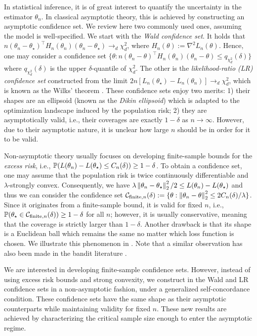 In statistical inference, it is of great interest to quantify the uncertainty in the estimator $\theta_n$.
In classical asymptotic theory, this is achieved by constructing an asymptotic confidence set.
We review here two commonly used ones, assuming the model is well-specified.
We start with the \emph{Wald confidence set}.
It holds that $n(\theta_n - \theta_\star)^\top H_n(\theta_n) (\theta_n - \theta_\star) \rightarrow_d \chi_d^2$, where $H_n(\theta) := \nabla^2 L_n(\theta)$.
Hence, one may consider a confidence set $\{\theta: n(\theta_n - \theta)^\top H_n(\theta_n) (\theta_n - \theta) \le q_{\chi_d^2}(\delta) \}$ where $q_{\chi_d^2}(\delta)$ is the upper $\delta$-quantile of $\chi_d^2$.
The other is the \emph{likelihood-ratio (LR) confidence set} constructed from the limit $2n [L_n(\theta_\star) - L_n(\theta_n)] \rightarrow_d \chi_d^2$, which is known as the Wilks' theorem \citep{wilks1938large}.
These confidence sets enjoy two merits: 1) their shapes are an ellipsoid (known as the \emph{Dikin ellipsoid}) which is adapted to the optimization landscape induced by the population risk; 2) they are asymptotically valid, i.e., their coverages are exactly $1 - \delta$ as $n \rightarrow \infty$.
However, due to their asymptotic nature, it is unclear how large $n$ should be in order for it to be valid.

Non-asymptotic theory usually focuses on developing finite-sample bounds for the \emph{excess risk}, i.e., $\operatorname{\mathbb P}(L(\theta_n) - L(\theta_\star) \le C_n(\delta)) \ge 1 - \delta$.
To obtain a confidence set, one may assume that the population risk is twice continuously differentiable and $\lambda$-strongly convex.
Consequently, we have $\lambda \left\lVert \theta_n - \theta_\star \right\rVert_2^2 / 2 \le L(\theta_n) - L(\theta_\star)$ and thus we can consider the confidence set $\mathcal{C}_{\text{finite}, n}(\delta) := \{\theta: \left\lVert \theta_n - \theta \right\rVert_2^2 \le 2C_n(\delta)/\lambda\}$.
Since it originates from a finite-sample bound, it is valid for fixed $n$, i.e., $\operatorname{\mathbb P}(\theta_\star \in \mathcal{C}_{\text{finite}, n}(\delta)) \ge 1 - \delta$ for all $n$; however, it is usually conservative, meaning that the coverage is strictly larger than $1 - \delta$.
Another drawback is that its shape is a Euclidean ball which remains the same no matter which loss function is chosen.
We illustrate this phenomenon in .
Note that a similar observation has also been made in the bandit literature \citep{faury2020improved}.

We are interested in developing finite-sample confidence sets.
However, instead of using excess risk bounds and strong convexity, we construct in  the Wald and LR confidence sets in a non-asymptotic fashion, under a generalized self-concordance condition.
These confidence sets have the same shape as their asymptotic counterparts while maintaining validity for fixed $n$.
These new results are achieved by characterizing the critical sample size enough to enter the asymptotic regime.
